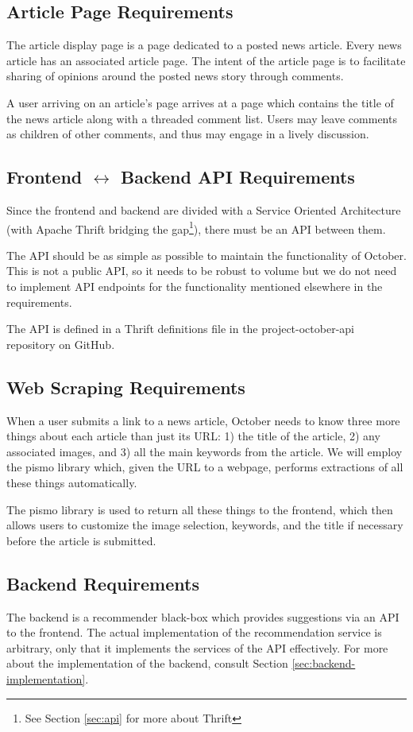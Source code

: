 \documentclass[11pt,letterpaper]{article}
\begin{document}
\subsection{Article Page Requirements}
The article display page is a page dedicated to a posted news article. Every news article has an associated article page.
The intent of the article page is to facilitate sharing of opinions around the posted news story through comments.

A user arriving on an article's page arrives at a page which contains the title of the news article along with a threaded comment list.
Users may leave comments as children of other comments, and thus may engage in a lively discussion.

\subsection{Frontend $\leftrightarrow$ Backend API Requirements}
Since the frontend and backend are divided with a Service Oriented Architecture (with Apache Thrift bridging the gap\footnote{See Section \ref{sec:api} for more about Thrift}), there must be an API between them.

The API should be as simple as possible to maintain the functionality of October. This is not a public API, so it needs to be robust to volume but we do not need to implement API endpoints for the functionality mentioned elsewhere in the requirements.

The API is defined in a Thrift definitions file in the project-october-api repository on GitHub\cite{project-october-api}.

\subsection{Web Scraping Requirements}
\label{sec:scraping}
When a user submits a link to a news article, October needs to know three more things about each article than just its URL: 1) the title of the article, 2) any associated images, and 3) all the main keywords from the article.
We will employ the pismo library\cite{pismo} which, given the URL to a webpage, performs extractions of all these things automatically.

The pismo library is used to return all these things to the frontend, which then allows users to customize the image selection, keywords, and the title if necessary before the article is submitted.

\subsection{Backend Requirements} %
The backend is a recommender black-box which provides suggestions via an API to the frontend.
The actual implementation of the recommendation service is arbitrary, only that it implements the services of the API effectively.
For more about the implementation of the backend, consult Section \ref{sec:backend-implementation}.
\end{document}
